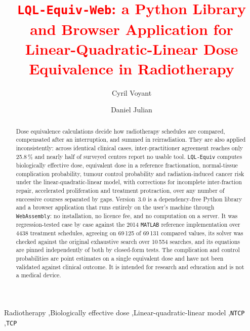 \documentclass[preprint,12pt,number]{elsarticle}
\newcommand{\cyr}[1]{\textcolor{red}{#1}}
\begin{document}
\begin{frontmatter}

\title{\cyr{\texttt{LQL-Equiv-Web}: a Python Library and Browser Application for Linear-Quadratic-Linear Dose Equivalence in Radiotherapy}}

\author[label1]{Cyril Voyant}
\author[label2]{Daniel Julian}


\begin{abstract}
Dose equivalence calculations decide how radiotherapy schedules are compared, compensated after an interruption, and summed in reirradiation. They are also applied inconsistently: across identical clinical cases, inter-practitioner agreement reaches only 25.8\,\% and nearly half of surveyed centres report no
usable tool. \texttt{LQL-Equiv} computes biologically effective dose, equivalent dose in a reference fractionation, normal-tissue complication probability, tumour control probability and radiation-induced cancer risk under the linear-quadratic-linear model, with corrections for incomplete inter-fraction repair, accelerated proliferation and treatment protraction, over any number of successive courses separated by gaps. Version~3.0 is a dependency-free Python library and a browser application that runs entirely on the user's machine through \texttt{WebAssembly}: no installation, no licence fee, and no computation on a server. It was regression-tested case by case against the 2014 \texttt{MATLAB} reference implementation over 4438 treatment schedules, agreeing on 69\,125 of 69\,131 compared values, its solver was checked against the original exhaustive search over 10\,554 searches, and its equations are pinned independently of both by closed-form tests. The complication and control probabilities are point estimates on a single equivalent dose and have not been validated against clinical outcome. It is intended for research and education and is not a medical device.
\end{abstract}

\begin{keyword}
Radiotherapy \sep Biologically effective dose \sep Linear-quadratic-linear model \sep \texttt{NTCP} \sep \texttt{TCP}  
\end{keyword}

\end{frontmatter}
\end{document}
